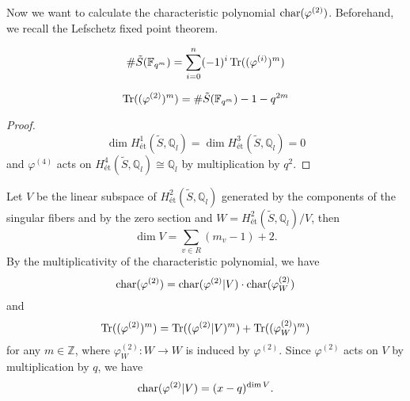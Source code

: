 \documentclass[main]{subfiles}
\begin{document}
Now we want to calculate the characteristic polynomial $\operatorname{char} (\varphi^{(2)})$.
Beforehand, we recall the Lefschetz fixed point theorem.

\begin{thm}
    \begin{equation*}
        \# \tilde{S}(\mathbb{F}_{q^{m}}) = \sum_{i = 0}^{n} ( - 1)^{i} \operatorname{Tr}((\varphi^{(i)})^{m})
    \end{equation*}
\end{thm}

\begin{cor}
    \label{cor:lefschetz}
    \begin{equation*}
        \operatorname{Tr} ((\varphi^{(2)})^{m}) = \# \tilde{S}(\mathbb{F}_{q^{m}}) - 1 - q^{2m}
    \end{equation*}
\end{cor}
\begin{proof}
    \begin{equation*}
        \dim H_{\text{\'et}}^{1}(\tilde{S}, \mathbb{Q}_{l}) = \dim H_{\text{\'et}}^{3}(\tilde{S}, \mathbb{Q}_{l}) = 0
    \end{equation*}
    and $\varphi^{(4)}$ acts on $H_{\text{\'et}}^{4}(\tilde{S}, \mathbb{Q}_l) \cong \mathbb{Q}_l$ by multiplication by $q^{2}$.
\end{proof}

Let $V$ be the linear subspace of $H_{\text{\'et}}^{2}(\tilde{S}, \mathbb{Q}_{l})$ generated by the components of the singular fibers and by the zero section and $W = H_{\text{\'et}}^{2}(\tilde{S}, \mathbb{Q}_l) / V$, then
\begin{equation*}
    \dim V = \sum_{v \in R} (m_{v} - 1) + 2.
\end{equation*}
By the multiplicativity of the characteristic polynomial, we have
\begin{equation*}
    \operatorname{char} (\varphi^{(2)}) = \operatorname{char} (\varphi^{(2)} | V) \cdot \operatorname{char} (\varphi^{(2)}_{W})
\end{equation*}
and
\begin{equation}
    \operatorname{Tr} ((\varphi^{(2)})^{m}) = \operatorname{Tr} ((\varphi^{(2)} | V)^{m}) + \operatorname{Tr} ((\varphi^{(2)}_{W})^{m}) \label{eq:trcomposition}
\end{equation}
for any $m \in \mathbb{Z}$, where $\varphi^{(2)}_W: W \to W$ is induced by $\varphi^{(2)}$.
Since $\varphi^{(2)}$ acts on $V$ by multiplication by $q$, we have
\begin{equation*}
    \operatorname{char} (\varphi^{(2)} | V) = (x - q)^{\dim V}.
\end{equation*}
\end{document}
